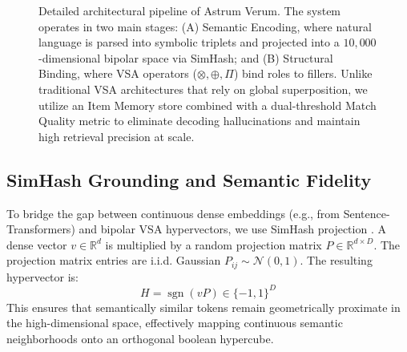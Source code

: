 \documentclass[11pt,letterpaper]{article}
\begin{document}
\begin{figure}[t]
{
    }
    \caption{Detailed architectural pipeline of Astrum Verum. The system operates in two main stages: (A) Semantic Encoding, where natural language is parsed into symbolic triplets and projected into a $10{,}000$-dimensional bipolar space via SimHash; and (B) Structural Binding, where VSA operators ($\otimes,\oplus,\Pi$) bind roles to fillers. Unlike traditional VSA architectures that rely on global superposition, we utilize an Item Memory store combined with a dual-threshold Match Quality metric to eliminate decoding hallucinations and maintain high retrieval precision at scale.}
    \label{fig:arch}
\end{figure}

\subsection{SimHash Grounding and Semantic Fidelity}
To bridge the gap between continuous dense embeddings
 (e.g., from Sentence-Transformers) and bipolar VSA hypervectors, we use SimHash projection \cite{charikar2002similarity}. A dense vector $v \in \mathbb{R}^d$ is multiplied by a random projection matrix $P \in \mathbb{R}^{d \times D}$. The projection matrix entries are i.i.d. Gaussian $P_{ij} \sim \mathcal{N}(0,1)$. The resulting hypervector is:
\begin{equation}
    H = \operatorname{sgn}(vP) \in \{-1,1\}^{D}
\end{equation}
This ensures that semantically similar tokens remain geometrically proximate in the high-dimensional space, effectively mapping continuous semantic neighborhoods onto an orthogonal boolean hypercube.
\end{document}
